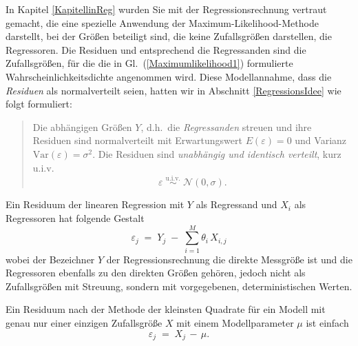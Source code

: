 In Kapitel \ref{KapitellinReg} wurden Sie mit der Regressionsrechnung vertraut gemacht, die
eine spezielle Anwendung der Maximum-Likelihood-Methode darstellt, bei der
Größen beteiligt sind, die keine Zufallsgrößen darstellen, die Regressoren.
Die Residuen und entsprechend die Regressanden sind die Zufallsgrößen,
für die die in Gl.~(\ref{Maximumlikelihood1}) formulierte Wahrscheinlichkeitsdichte
angenommen wird.
Diese Modellannahme, dass die \textsl{Residuen} als normalverteilt seien,
hatten wir in Abschnitt \ref{RegressionsIdee} wie folgt formuliert:
\begin{quote}
Die abhängigen Größen $Y$, d.h.\ die \textsl{Regressanden} streuen und ihre Residuen sind
	normalverteilt mit Erwartungswert $E(\varepsilon) = 0$ und Varianz $\mathrm{Var}(\varepsilon) = \sigma^2$. 
	Die Residuen sind \textsl{unabhängig und identisch verteilt}, kurz u.i.v.
	\begin{equation}
	\varepsilon \; \overset{\mathrm{u.i.v.}}{\sim} \; \mathcal{N}(0,\sigma) .
	\label{Resinormalverteilt}
	\end{equation}
\end{quote}
Ein Residuum der linearen Regression mit $Y$ als Regressand und $X_i$ als Regressoren
hat folgende Gestalt
\begin{equation}
\varepsilon_j \; = \; Y_j \; - \; \sum\limits_{i=1}^{M} \theta_i \, X_{i,j}
\end{equation}
wobei der Bezeichner $Y$ der Regressionsrechnung die direkte Messgröße ist und die
Regressoren ebenfalls zu den direkten Größen gehören, jedoch nicht als Zufallsgrößen mit
Streuung, sondern mit vorgegebenen, deterministischen Werten.

Ein Residuum nach der Methode der kleinsten Quadrate für ein Modell mit genau nur einer
einzigen Zufallsgröße $X$ mit einem Modellparameter $\mu$ ist einfach
\begin{equation}
\varepsilon_j \; = \; X_j \, - \, \mu .
\label{oneQuantityOnly1}
\end{equation}

